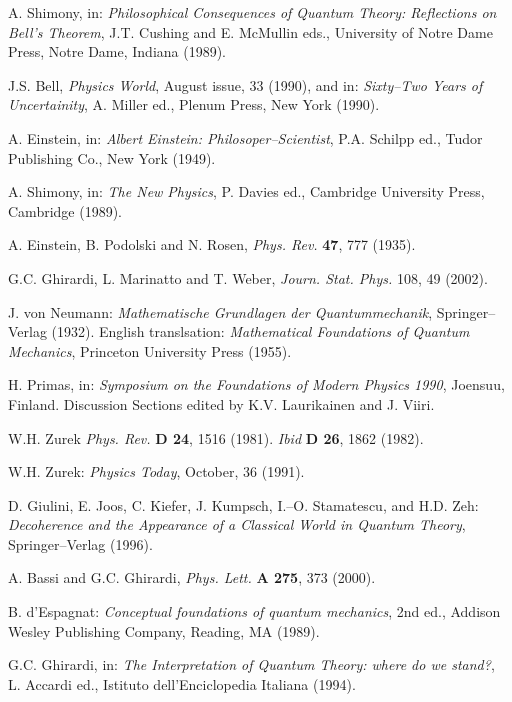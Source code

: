 \documentclass[10pt,a4paper]{article}
\begin{document}
\begin{thebibliography}{999}

 A. Shimony, in: {\it Philosophical Consequences
of Quantum Theory: Reflections on Bell's Theorem}, J.T. Cushing
and E. McMullin eds., University of Notre Dame Press, Notre Dame,
Indiana (1989).

 J.S. Bell, {\it Physics World}, August issue, 33
(1990), and in: {\it Sixty--Two Years of Uncertainity}, A. Miller
ed., Plenum Press, New York (1990).

 A. Einstein, in: {\it Albert Einstein:
Philosoper--Scientist}, P.A. Schilpp ed., Tudor Publishing Co.,
New York (1949).

 A. Shimony, in: {\it The New Physics}, P. Davies
ed., Cambridge University Press, Cambridge (1989).

 A. Einstein, B. Podolski and N. Rosen, {\it Phys.
Rev.} {\bf 47}, 777 (1935).

 G.C. Ghirardi, L. Marinatto and T. Weber, {\it
Journ. Stat. Phys.} 108, 49 (2002).

 J. von Neumann: {\it Mathematische Grundlagen der
Quantummechanik}, Springer--Verlag (1932). English translsation:
{\it Mathematical Foundations of Quantum Mechanics}, Princeton
University Press (1955).

 H. Primas, in: {\it Symposium on the Foundations of
Modern Physics 1990}, Joensuu, Finland. Discussion Sections edited
by K.V. Laurikainen and J. Viiri.

 W.H. Zurek {\it Phys. Rev.} {\bf D 24}, 1516
(1981). {\it Ibid} {\bf D 26}, 1862 (1982).

 W.H. Zurek: {\it Physics Today}, October, 36 (1991).

 D. Giulini, E. Joos, C. Kiefer, J. Kumpsch, I.--O.
Stamatescu, and H.D. Zeh: {\it Decoherence and the Appearance of a
Classical World in Quantum Theory}, Springer--Verlag (1996).

 A. Bassi and G.C. Ghirardi, {\it Phys. Lett.} {\bf A
275}, 373 (2000).

 B. d'Espagnat: {\it Conceptual foundations of quantum
mechanics}, 2nd ed., Addison Wesley Publishing Company, Reading,
MA (1989).

 G.C. Ghirardi, in: {\it The Interpretation of
Quantum Theory: where do we stand?}, L. Accardi ed., Istituto
dell'Enciclopedia Italiana (1994).


\end{thebibliography}
\end{document}
